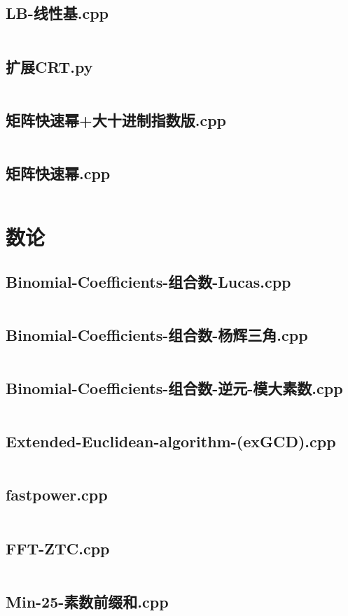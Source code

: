 \documentclass[a4paper,landscape,twocolumn]{article} %
\begin{document}
\subsection{LB-线性基.cpp}
\inputminted{c++}{./codes/019}
\subsection{扩展CRT.py}
\inputminted{python}{./codes/020}
\subsection{矩阵快速幂+大十进制指数版.cpp}
\inputminted{c++}{./codes/021}
\subsection{矩阵快速幂.cpp}
\inputminted{c++}{./codes/022}
\section{数论}
\subsection{Binomial-Coefficients-组合数-Lucas.cpp}
\inputminted{c++}{./codes/023}
\subsection{Binomial-Coefficients-组合数-杨辉三角.cpp}
\inputminted{c++}{./codes/024}
\subsection{Binomial-Coefficients-组合数-逆元-模大素数.cpp}
\inputminted{c++}{./codes/025}
\subsection{Extended-Euclidean-algorithm-(exGCD).cpp}
\inputminted{c++}{./codes/026}
\subsection{fastpower.cpp}
\inputminted{c++}{./codes/027}
\subsection{FFT-ZTC.cpp}
\inputminted{c++}{./codes/028}
\subsection{Min-25-素数前缀和.cpp}
\inputminted{c++}{./codes/029}
\end{document}
